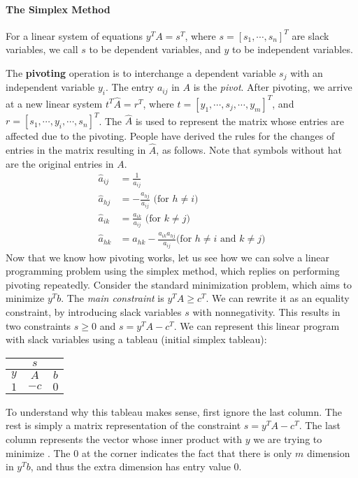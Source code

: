 \documentclass[12pt]{article}
\begin{document}
\paragraph{The Simplex Method}

For a linear system of equations $y^TA=s^T$, where $s=[s_1,\cdots,s_n]^T$ are slack variables, we call $s$ to be dependent variables, and $y$ to be independent variables.

The \textbf{pivoting} operation is to interchange a dependent variable $s_j$ with an independent variable $y_i$. The entry $a_{ij}$ in $A$ is the \emph{pivot}. After pivoting, we arrive at a new linear system $t^T\hat{A}=r^T$, where $t=[y_1,\cdots,s_j,\cdots,y_m]^T$, and $r=[s_1,\cdots,y_i,\cdots,s_n]^T$. The $\hat{A}$ is used to represent the matrix whose entries are affected due to the pivoting. People have derived the rules for the changes of entries in the matrix resulting in $\hat{A}$, as follows. Note that symbols without hat are the original entries in $A$.
\begin{align}
  \hat{a}_{ij} &= \frac{1}{a_{ij}}\\
  \hat{a}_{hj} &= -\frac{a_{hj}}{a_{ij}}\text{ (for $h\neq i$)}\\
  \hat{a}_{ik} &= \frac{a_{ik}}{a_{ij}}\text{  (for $k\neq j$)}\\
  \hat{a}_{hk} &= a_{hk} - \frac{a_{ik}a_{hj}}{a_{ij}}\text{(for $h\neq i$ and $k\neq j$)}
\end{align}
Now that we know how pivoting works, let us see how we can solve a linear programming problem using the simplex method, which replies on performing pivoting repeatedly. Consider the standard minimization problem, which aims to minimize $y^Tb$. The \emph{main constraint} is $y^TA\geq c^T$. We can rewrite it as an equality constraint, by introducing slack variables $s$ with nonnegativity. This results in two constraints $s\geq 0$ and $s=y^TA-c^T$. We can represent this linear program with slack variables using a tableau (initial simplex tableau):
\begin{center}
  \begin{tabular}{ c|c|c }
        & $s$ &\\
    \hline
    $y$ & $A$ & $b$\\
    \hline
    $1$ & $-c$ & $0$\\
\end{tabular}
\end{center}
To understand why this tableau makes sense, first ignore the last column. The rest is simply a matrix representation of the constraint $s=y^TA-c^T$. The last column represents the vector whose inner product with $y$ we are trying to minimize \cite{ferguson1958linear}. The 0 at the corner indicates the fact that there is only $m$ dimension in $y^Tb$, and thus the extra dimension has entry value 0.
\end{document}
